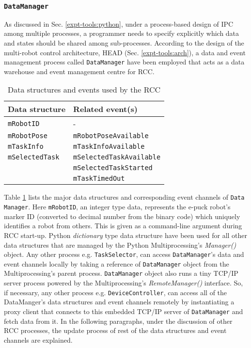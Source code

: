\subsubsection*{\texttt{DataManager}}
As discussed in Sec. \ref{expt-tools:python}, under a process-based design of IPC among multiple processes, a programmer needs to specify explicitly which data and states should be shared among sub-processes. According to the design of the multi-robot control architecture, HEAD (Sec. \ref{expt-tools:arch}), a data and event management process called \texttt{DataManager}  have been employed that acts as a data warehouse and event management centre for RCC.\\
\begin{table}
\caption{Data structures and events used by the RCC}
\begin{center}
\begin{tabular}{|l|l|}
\hline \textbf{Data structure} & \textbf{Related event(s)}\\ 
\hline \texttt{\texttt{mRobotID}} & - \\ 
\hline \texttt{mRobotPose} & \texttt{mRobotPoseAvailable}\\ 
\hline \texttt{mTaskInfo} & \texttt{mTaskInfoAvailable}\\ 
\hline \texttt{mSelectedTask} & \texttt{mSelectedTaskAvailable}\\
 &  \texttt{mSelectedTaskStarted}\\
 &  \texttt{mTaskTimedOut}\\
 \hline 
\end{tabular}
\end{center}
\label{table:data-mgr}
\end{table} 
Table \ref{table:data-mgr} lists the major data structures and corresponding event channels of \texttt{Data Manager}. Here \texttt{mRobotID}, an integer type data,  represents the e-puck robot's marker ID (converted to decimal number from the binary code) which uniquely identifies a robot from others. This is given as a command-line argument during RCC start-up. Python {\em dictionary} type data structure  have been used  for all other data structures that are managed by the Python Multiprocessing's {\em Manager()} object. Any other process e.g. \texttt{TaskSelector}, can access \texttt{DataManager}'s data and event channels locally  by taking a reference of \texttt{DataManager} object from the Multiprocessing's parent process. \texttt{DataManager} object also runs a tiny TCP/IP server process powered by the Multiprocessing's {\em RemoteManager()} interface. So, if necessary,  any other process e.g. \texttt{DeviceController}, can access all of the DataManger's data structures and event channels remotely by instantiating a proxy client  that connects to this embedded TCP/IP server of \texttt{DataManager} and  fetch data from it. In the following paragraphs, under the discussion of other RCC processes, the update process of rest of the data structures and event channels are explained.
